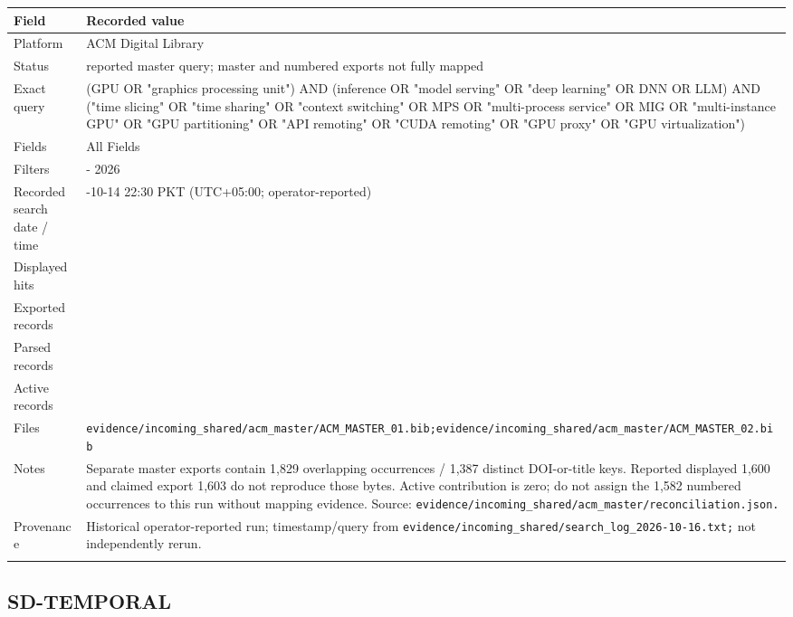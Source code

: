 \begin{longtable}{>{\raggedright\arraybackslash}p{}>{\raggedright\arraybackslash}p{}}
\toprule
\textbf{Field} & \textbf{Recorded value}\\\midrule\endhead
Platform & ACM Digital Library\\\addlinespace
Status & reported master query; master and numbered exports not fully mapped\\\addlinespace
Exact query & (GPU OR "graphics processing unit") AND (inference OR "model serving" OR "deep learning" OR DNN OR LLM) AND ("time slicing" OR "time sharing" OR "context switching" OR MPS OR "multi-process service" OR MIG OR "multi-instance GPU" OR "GPU partitioning" OR "API remoting" OR "CUDA remoting" OR "GPU proxy" OR "GPU virtualization")\\\addlinespace
Fields & All Fields\\\addlinespace
Filters & 2020 - 2026\\\addlinespace
Recorded search date / time & 2026-10-14 22:30 PKT (UTC+05:00; operator-reported)\\\addlinespace
Displayed hits & 1600\\\addlinespace
Exported records & 1603\\\addlinespace
Parsed records & 1829\\\addlinespace
Active records & 0\\\addlinespace
Files & \nolinkurl{evidence/incoming_shared/acm_master/ACM_MASTER_01.bib;evidence/incoming_shared/acm_master/ACM_MASTER_02.bib}\\\addlinespace
Notes & Separate master exports contain 1,829 overlapping occurrences / 1,387 distinct DOI-or-title keys. Reported displayed 1,600 and claimed export 1,603 do not reproduce those bytes. Active contribution is zero; do not assign the 1,582 numbered occurrences to this run without mapping evidence. Source: \nolinkurl{evidence/incoming_shared/acm_master/reconciliation.json.}\\\addlinespace
Provenance & Historical operator-reported run; timestamp/query from \nolinkurl{evidence/incoming_shared/search_log_2026-10-16.txt;} not independently rerun.\\\addlinespace
\bottomrule\end{longtable}

\subsection{SD-TEMPORAL}

